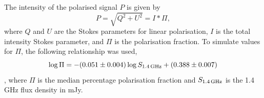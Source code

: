 \documentclass[fleqn,usenatbib]{mnras}
\begin{document}
The intensity of the polarised signal $P$ is given by
%
\begin{equation}
\label{eq:PolarisedSignal}
P = \sqrt{Q^2 + U^2} = I*\Pi,
\end{equation}
%
where $Q$ and $U$ are the Stokes parameters for linear polarisation, $I$ is the total intensity Stokes parameter, and $\Pi$ is the polarisation fraction. To simulate values for $\Pi$, the following relationship was used,
%
\begin{equation}
\label{eq:StilEquation}
\log \Pi = -(0.051\pm0.004) \log S_{\rm 1.4\,GHz} + (0.388\pm0.007)
\end{equation}
%
\citep{Stil_2014}, where $\Pi$ is the median percentage polarisation fraction and $S_{\rm 1.4\,GHz}$ is the 1.4\,GHz flux density in mJy.
%
%
%
\end{document}

